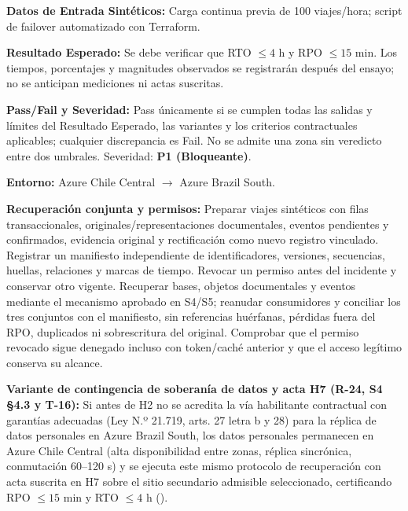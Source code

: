 \par\noindent \textbf{Datos de Entrada Sintéticos:} Carga continua previa de 100 viajes/hora; script de failover automatizado con Terraform.\par
\par\noindent \textbf{Resultado Esperado:} Se debe verificar que RTO $\le 4\text{ h}$ y RPO $\le 15\text{ min}$. Los tiempos, porcentajes y magnitudes observados se registrarán después del ensayo; no se anticipan mediciones ni actas suscritas.\par
\par\noindent \textbf{Pass/Fail y Severidad:} Pass únicamente si se cumplen todas las salidas y límites del Resultado Esperado, las variantes y los criterios contractuales aplicables; cualquier discrepancia es Fail. No se admite una zona sin veredicto entre dos umbrales. Severidad: \textbf{P1 (Bloqueante)}.\par
\par\noindent \textbf{Entorno:} Azure Chile Central $\rightarrow$ Azure Brazil South.\par



\par\noindent\textbf{Recuperación conjunta y permisos:} Preparar viajes sintéticos con filas transaccionales, originales/representaciones documentales, eventos pendientes y confirmados, evidencia original y rectificación como nuevo registro vinculado. Registrar un manifiesto independiente de identificadores, versiones, secuencias, huellas, relaciones y marcas de tiempo. Revocar un permiso antes del incidente y conservar otro vigente. Recuperar bases, objetos documentales y eventos mediante el mecanismo aprobado en S4/S5; reanudar consumidores y conciliar los tres conjuntos con el manifiesto, sin referencias huérfanas, pérdidas fuera del RPO, duplicados ni sobrescritura del original. Comprobar que el permiso revocado sigue denegado incluso con token/caché anterior y que el acceso legítimo conserva su alcance.\par

\par\noindent\textbf{Variante de contingencia de soberanía de datos y acta H7 (R-24, S4 §4.3 y T-16):} Si antes de H2 no se acredita la vía habilitante contractual con garantías adecuadas (Ley N.º 21.719, arts. 27 letra b y 28) para la réplica de datos personales en Azure Brazil South, los datos personales permanecen en Azure Chile Central (alta disponibilidad entre zonas, réplica sincrónica, conmutación 60--120 s) y se ejecuta este mismo protocolo de recuperación con acta suscrita en H7 sobre el sitio secundario admisible seleccionado, certificando RPO $\le 15\text{ min}$ y RTO $\le 4\text{ h}$ ().\par

